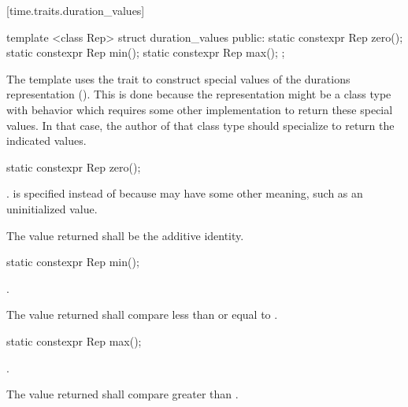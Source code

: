 [time.traits.duration_values]{}

%
\begin{itemdecl}
template <class Rep>
struct duration_values {
public:
  static constexpr Rep zero();
  static constexpr Rep min();
  static constexpr Rep max();
};
\end{itemdecl}

\pnum
The  template uses the  trait to
construct special values of the durations representation (). This is
done because the representation might be a class type with behavior which
requires some other implementation to return these special values. In that case,
the author of that class type should specialize  to
return the indicated values.

%
%
\begin{itemdecl}
static constexpr Rep zero();
\end{itemdecl}

\begin{itemdescr}
\pnum
\returns {}. \enternote {} is specified instead of
 because  may have some other meaning, such as an
uninitialized value. \exitnote

\pnum
\remark The value returned shall be the additive identity.
\end{itemdescr}

%
%
\begin{itemdecl}
static constexpr Rep min();
\end{itemdecl}

\begin{itemdescr}
\pnum
\returns {}.

\pnum
\remark The value returned shall compare less than or equal to .
\end{itemdescr}

%
%
\begin{itemdecl}
static constexpr Rep max();
\end{itemdecl}

\begin{itemdescr}
\pnum
\returns {}.

\pnum
\remark The value returned shall compare greater than .
\end{itemdescr}

